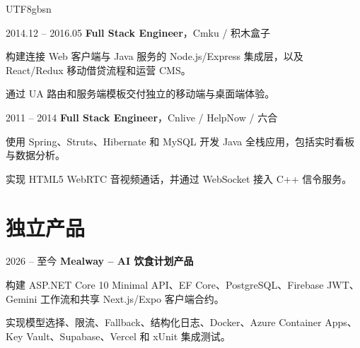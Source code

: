 \documentclass[10pt, letterpaper]{article}
\begin{document}
\begin{CJK*}{UTF8}{gbsn}
        \vspace{0.2 cm}
        \begin{twocolentry}{2014.12 -- 2016.05}
            \textbf{Full Stack Engineer}，Cmku / 积木盒子
        \end{twocolentry}
        \begin{onecolentry}
            \begin{highlights}
                \item 构建连接 Web 客户端与 Java 服务的 Node.js/Express 集成层，以及 React/Redux 移动借贷流程和运营 CMS。
                \item 通过 UA 路由和服务端模板交付独立的移动端与桌面端体验。
            \end{highlights}
        \end{onecolentry}

        \vspace{0.2 cm}
        \begin{twocolentry}{2011 -- 2014}
            \textbf{Full Stack Engineer}，Cnlive / HelpNow / 六合
        \end{twocolentry}
        \begin{onecolentry}
            \begin{highlights}
                \item 使用 Spring、Struts、Hibernate 和 MySQL 开发 Java 全栈应用，包括实时看板与数据分析。
                \item 实现 HTML5 WebRTC 音视频通话，并通过 WebSocket 接入 C++ 信令服务。
            \end{highlights}
        \end{onecolentry}

    \section{独立产品}
        \begin{twocolentry}{2026 -- 至今}
            \textbf{Mealway -- AI 饮食计划产品}
        \end{twocolentry}
        \begin{onecolentry}
            \begin{highlights}
                \item 构建 ASP.NET Core 10 Minimal API、EF Core、PostgreSQL、Firebase JWT、Gemini 工作流和共享 Next.js/Expo 客户端合约。
                \item 实现模型选择、限流、Fallback、结构化日志、Docker、Azure Container Apps、Key Vault、Supabase、Vercel 和 xUnit 集成测试。
            \end{highlights}
        \end{onecolentry}


\end{CJK*}
\end{document}
